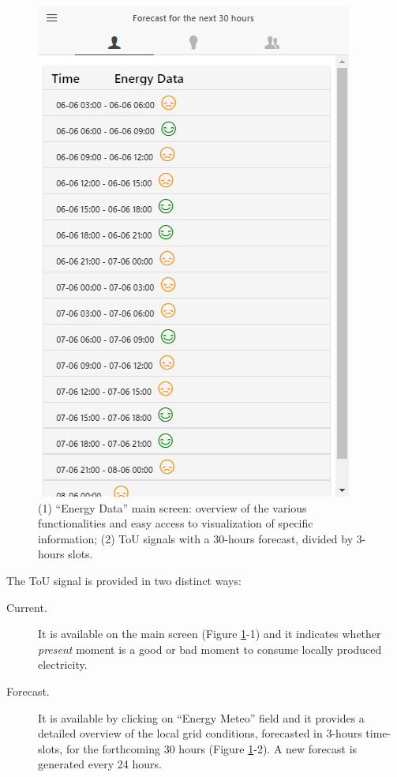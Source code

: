 \begin{figure}[htb]
\begin{center}
\begin{minipage}[htb]{0.33\linewidth}
         \includegraphics[width=1\linewidth]{img/touprediction.png}   
        \end{minipage}
      \end{center}
      \caption{(1) ``Energy Data'' main screen: overview of the various functionalities and easy access to visualization of specific information;
(2) ToU signals with a 30-hours forecast, divided by 3-hours slots.}\label{fig:overview-tou}
\end{figure}

The ToU signal is provided in two distinct ways:
\begin{description}
 \item[Current.] It is available on the main screen (Figure \ref{fig:overview-tou}-1) and it indicates whether \textit{present} moment is a good or bad moment to consume locally produced electricity.
 \item[Forecast.] It is available by clicking on ``Energy Meteo'' field and it provides a detailed overview of the local grid conditions, forecasted in 3-hours time-slots, for the forthcoming 30 hours (Figure \ref{fig:overview-tou}-2). A new forecast is generated every 24 hours.
\end{description}



